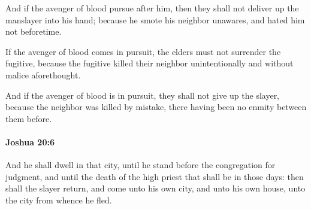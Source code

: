 			\begin{versebox}
					\item[BHS] 
					\item[ASV] And if the avenger of blood pursue after him, then they shall not deliver up the manslayer into his hand; because he smote his neighbor unawares, and hated him not beforetime.
					\item[NIV] If the avenger of blood comes in pursuit, the elders must not surrender the fugitive, because the fugitive killed their neighbor unintentionally and without malice aforethought.
					\item[NRSV] And if the avenger of blood is in pursuit, they shall not give up the slayer, because the neighbor was killed by mistake, there having been no enmity between them before.
			\end{versebox}

		\paragraph{Joshua 20:6} %
			\label{JOSHUA-20-6}

			And he shall dwell in that city, until he stand before the congregation for judgment, and until the death of the high priest that shall be in those days: then shall the slayer return, and come unto his own city, and unto his own house, unto the city from whence he fled.

